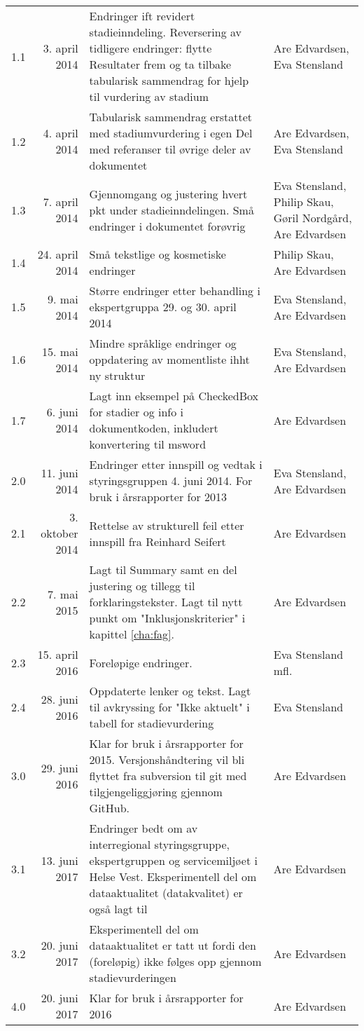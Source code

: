 \documentclass[norsk, a4paper, twocolumn]{report}
\begin{document}
\begin{longtable}{lrp{8cm}p{2.5cm}}
    1.1 & 3. april 2014 & Endringer ift revidert stadieinndeling. Reversering
    av tidligere endringer: flytte Resultater frem og ta tilbake
    tabularisk sammendrag for hjelp til vurdering av stadium & Are Edvardsen,
    Eva Stensland \\
    1.2 & 4. april 2014 & Tabularisk sammendrag erstattet med stadiumvurdering
    i egen Del med referanser til øvrige deler av dokumentet & Are Edvardsen,
    Eva Stensland \\
    1.3 & 7. april 2014 & Gjennomgang og justering hvert pkt under
    stadieinndelingen. Små endringer i dokumentet forøvrig &
    Eva Stensland, Philip Skau, Gøril Nordgård, Are Edvardsen \\
    1.4 & 24. april 2014 & Små tekstlige og kosmetiske endringer &
    Philip Skau, Are Edvardsen \\
    1.5 & 9. mai 2014 & Større endringer etter behandling i ekspertgruppa
    29. og 30. april 2014 & Eva Stensland, Are Edvardsen \\
    1.6 & 15. mai 2014 & Mindre språklige endringer og oppdatering av
    momentliste ihht ny struktur & Eva Stensland, Are Edvardsen \\
    1.7 & 6. juni 2014 & Lagt inn eksempel på CheckedBox for stadier og info
    i dokumentkoden, inkludert konvertering til msword & Are Edvardsen \\
    2.0 & 11. juni 2014 & Endringer etter innspill og vedtak i styringsgruppen
    4. juni 2014. For bruk i årsrapporter for 2013 & Eva Stensland,
    Are Edvardsen \\
    2.1 & 3. oktober 2014 & Rettelse av strukturell feil etter innspill fra
    Reinhard Seifert & Are Edvardsen \\
    2.2 & 7. mai 2015 & Lagt til Summary samt en del justering og tillegg
    til forklaringstekster. Lagt til nytt punkt om "Inklusjonskriterier" i
    kapittel \ref{cha:fag}. & Are Edvardsen \\
    2.3 & 15. april 2016 & Foreløpige endringer. & Eva Stensland mfl. \\
    2.4 & 28. juni 2016 & Oppdaterte lenker og tekst. Lagt til avkryssing
    for "Ikke aktuelt" i tabell for stadievurdering & Eva Stensland \\
    3.0 & 29. juni 2016 & Klar for bruk i årsrapporter for 2015.
    Versjonshåndtering vil bli flyttet fra subversion til git med 
    tilgjengeliggjøring gjennom GitHub. & Are Edvardsen \\
    3.1 & 13. juni 2017 & Endringer bedt om av interregional styringsgruppe,
    ekspertgruppen og servicemiljøet i Helse Vest. Eksperimentell del om
    dataaktualitet (datakvalitet) er også lagt til & Are Edvardsen \\
    3.2 & 20. juni 2017 & Eksperimentell del om dataaktualitet er tatt ut fordi
    den (foreløpig) ikke følges opp gjennom stadievurderingen & Are Edvardsen \\
    4.0 & 20. juni 2017 & Klar for bruk i årsrapporter for 2016 & Are Edvardsen 
  \label{tab:log}
\end{longtable}
\fi
\end{document}
